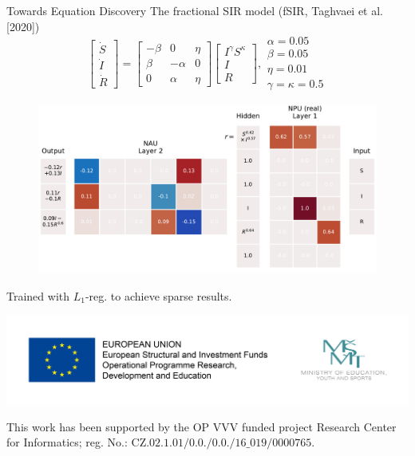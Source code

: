 \documentclass{beamer}
\begin{document}
\begin{frame}{Towards Equation Discovery}
  \centering
  The fractional SIR model (fSIR, Taghvaei et al. [2020])
  \begin{equation*}
    \begin{bmatrix}
      \dot S \\ \dot I \\ \dot R
    \end{bmatrix}
    =
    \begin{bmatrix}
      -\beta & 0 & \eta \\
      \beta & -\alpha & 0 \\
      0 & \alpha & \eta
    \end{bmatrix}
    \begin{bmatrix}
      I^\gamma S^\kappa \\ I \\ R
    \end{bmatrix},
    \begin{matrix}
      \alpha=0.05 \\ \beta=0.05 \\ \eta=0.01 \\ \gamma=\kappa=0.5
    \end{matrix}
  \end{equation*}
  \begin{figure}
    \includegraphics[width=0.8\linewidth]{../plots/sir_gatednpu_modelps.pdf}
  \end{figure}
  \vspace{-1.5cm}
  \hspace{-4cm}
  {\tiny *Trained with $L_1$-reg. to achieve sparse results.}
\end{frame}

\begin{frame}
  \includegraphics[width=\textwidth]{rci.jpg}

  This work has been supported by the OP VVV funded project Research Center
  for Informatics; reg. No.: CZ$.02.1.01/0.0./0.0./16\_019/0000765$.
\end{frame} 

\maketitle
\end{document}
